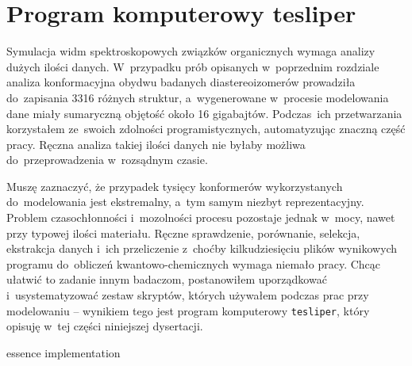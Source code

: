 \chapter{Program komputerowy tesliper}\label{chapter:tesliper}
Symulacja widm spektroskopowych związków organicznych wymaga analizy dużych ilości danych.
W~przypadku prób opisanych w~poprzednim rozdziale
  analiza konformacyjna obydwu badanych diastereoizomerów prowadziła
  do~zapisania 3316 różnych struktur, a~wygenerowane w~procesie modelowania
  dane miały sumaryczną objętość około 16 gigabajtów.
Podczas~ich przetwarzania korzystałem ze~swoich zdolności programistycznych, automatyzując
  znaczną część pracy.
Ręczna analiza takiej ilości danych nie byłaby możliwa do~przeprowadzenia w~rozsądnym czasie.

Muszę zaznaczyć, że przypadek tysięcy konformerów wykorzystanych do~modelowania jest
  ekstremalny, a~tym samym niezbyt reprezentacyjny.
Problem czasochłonności i~mozolności procesu pozostaje jednak w~mocy,
  nawet przy typowej ilości materiału.
Ręczne sprawdzenie, porównanie, selekcja, ekstrakcja danych i~ich przeliczenie z~choćby
  kilkudziesięciu plików wynikowych programu do~obliczeń kwantowo-chemicznych wymaga
  niemało pracy.
Chcąc ułatwić to zadanie innym badaczom, postanowiłem uporządkować i~usystematyzować
  zestaw skryptów, których używałem podczas prac przy modelowaniu \--- wynikiem tego jest
  program komputerowy \texttt{tesliper}, który opisuję w~tej części niniejszej dysertacji.

{essence}
{implementation}
